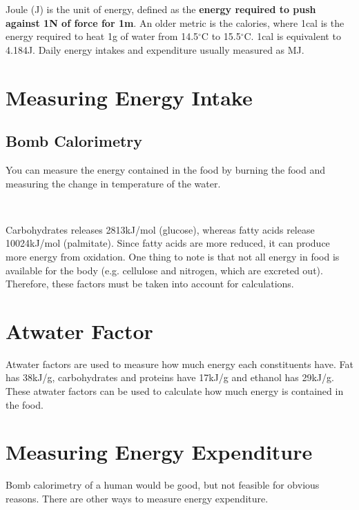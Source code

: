 \documentclass[a4paper, 12pt]{report}
\begin{document}
Joule (J) is the unit of energy, defined as the \textbf{energy required to push against 1N of force for 1m}.
An older metric is the calories, where 1cal is the energy required to heat 1g of water from 14.5$^\circ$C to 15.5$^\circ$C.
1cal is equivalent to 4.184J.
Daily energy intakes and expenditure usually measured as MJ.

\section{Measuring Energy Intake}

\subsection{Bomb Calorimetry}

You can measure the energy contained in the food by burning the food and measuring the change in temperature of the water.

\begin{center}
\\
\end{center}

Carbohydrates releases 2813kJ/mol (glucose), whereas fatty acids release 10024kJ/mol (palmitate).
Since fatty acids are more reduced, it can produce more energy from oxidation.
One thing to note is that not all energy in food is available for the body (e.g. cellulose and nitrogen, which are excreted out).
Therefore, these factors must be taken into account for calculations.

\section{Atwater Factor}

Atwater factors are used to measure how much energy each constituents have.
Fat has 38kJ/g, carbohydrates and proteins have 17kJ/g and ethanol has 29kJ/g.
These atwater factors can be used to calculate how much energy is contained in the food.

\section{Measuring Energy Expenditure}

Bomb calorimetry of a human would be good, but not feasible for obvious reasons.
There are other ways to measure energy expenditure.
\end{document}
